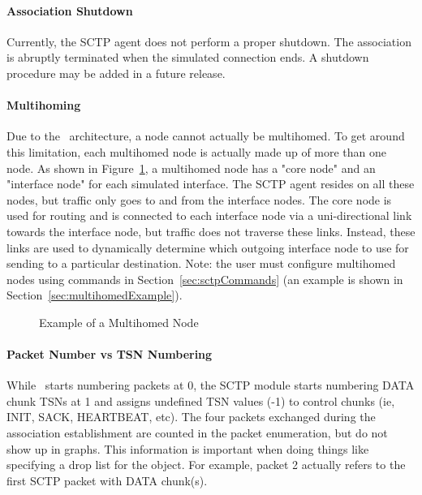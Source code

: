       \paragraph{Association Shutdown} Currently, the SCTP agent does not
      perform a proper shutdown. The association is abruptly terminated
      when the simulated connection ends. A shutdown procedure may be
      added in a future release.

      \paragraph{Multihoming}  Due to the \ns~architecture, a node cannot
      actually be multihomed. To get around this limitation, each
      multihomed node is actually made up of more than one node. As shown
      in Figure~\ref{fig:multihomedNode}, a multihomed node has a "core
      node" and an "interface node" for each simulated interface. The SCTP
      agent resides on all these nodes, but traffic only goes to and from
      the interface nodes. The core node is used for routing and is
      connected to each interface node via a uni-directional link towards
      the interface node, but traffic does not traverse these
      links. Instead, these links are used to dynamically determine which
      outgoing interface node to use for sending to a particular
      destination. Note: the user must configure multihomed nodes using
      commands in Section~\ref{sec:sctpCommands} (an example is shown in
      Section~\ref{sec:multihomedExample}).

      \begin{figure}[tb] 
	\centerline{}
	\caption{Example of a Multihomed Node}
	\label{fig:multihomedNode} 
      \end{figure}

      \paragraph{Packet Number vs TSN Numbering} While \ns~starts numbering
      packets at 0, the SCTP module starts numbering DATA chunk TSNs at 1
      and assigns undefined TSN values (-1) to control chunks (ie, INIT,
      SACK, HEARTBEAT, etc). The four packets exchanged during the
      association establishment are counted in the packet enumeration, but
      do not show up in graphs. This information is important when doing
      things like specifying a drop list for the 
      object. For example, packet 2 actually refers to the first SCTP
      packet with DATA chunk(s).



